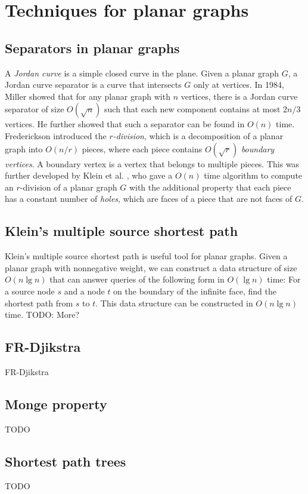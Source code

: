 \section{Techniques for planar graphs}\label{techniques}

\subsection{Separators in planar graphs}
A \textit{Jordan curve} is a simple closed curve in the plane. Given a planar graph $G$,
a Jordan curve separator is a curve that intersects $G$ only at vertices. In 1984, Miller
\cite{miller1984finding} showed that for any planar graph with $n$ vertices, there is a Jordan curve
separator of size $O(\sqrt{n})$ such that each new component contains at most $2n/3$
vertices. He further showed that such a separator can be found in $O(n)$ time. \\
Frederickson introduced the \textit{$r$-division}, which is a decomposition of a planar graph into
$O(n/r)$ pieces, where each piece contains $O(\sqrt{r})$ \textit{boundary vertices}. A
boundary vertex is a vertex that belongs to multiple pieces. This was further developed
by Klein et al. \cite{klein2013structured}, who gave a $O(n)$ time algorithm to compute
an $r$-division of a planar graph $G$ with the additional property that each piece has a constant number of \textit{holes}, which are
faces of a piece that are not faces of $G$.

\subsection{Klein's multiple source shortest path}
Klein's multiple source shortest path \cite{klein2005multiple} is useful tool for planar
graphs. Given a planar graph with nonnegative weight, we can construct a data structure
of size $O(n \lg n)$ that can answer queries of the following form in $O(\lg n)$ time:
For a source node $s$ and a node $t$ on the boundary of the infinite face, find the
shortest path from $s$ to $t$. This data structure can be constructed in $O(n \lg n)$
time. TODO: More?

\subsection{FR-Djikstra}
FR-Djikstra \cite{fakcharoenphol2006planar}\\

\subsection{Monge property}
TODO

\subsection{Shortest path trees}
TODO

